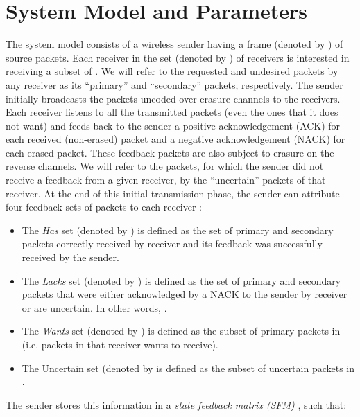 \documentclass[10pt,jounral]{IEEEtran}
\newcommand{\ignore}[1]{}
\begin{document}
\section{System Model and Parameters} \label{sec:model}
The system model consists of a wireless sender having a frame (denoted by ) of  source packets. Each receiver in the set (denoted by ) of  receivers is interested in receiving a subset of . We will refer to the requested and undesired packets by any receiver as its ``primary'' and ``secondary'' packets, respectively. The sender initially broadcasts the  packets uncoded over erasure channels to the  receivers. Each receiver listens to all the transmitted packets (even the ones that it does not want) and feeds back to the sender a positive acknowledgement (ACK) for each received (non-erased) packet and a negative acknowledgement (NACK) for each erased packet. These feedback packets are also subject to erasure on the reverse channels. We will refer to the packets, for which the sender did not receive a feedback from a given receiver, by the ``uncertain'' packets of that receiver. At the end of this initial transmission phase, the sender can attribute four feedback sets of packets to each receiver :
\begin{itemize}
\item The \emph{Has} set (denoted by ) is defined as the set of primary and secondary packets correctly received by receiver  and its feedback was successfully received by the sender.\ignore{ This set includes both desired and undesired packets by this receiver.}
\item The \emph{Lacks} set (denoted by ) is defined as the set of primary and secondary packets that were either acknowledged by a NACK to the sender by receiver  or are uncertain. In other words, .
\item The \emph{Wants} set (denoted by ) is defined as the subset of primary packets in  (i.e. packets in  that receiver  wants to receive).
\item The Uncertain set (denoted by  is defined as the subset of uncertain packets in .
\end{itemize}
The sender stores this information in a \emph{state feedback matrix (SFM)} , such that:
\end{document}
